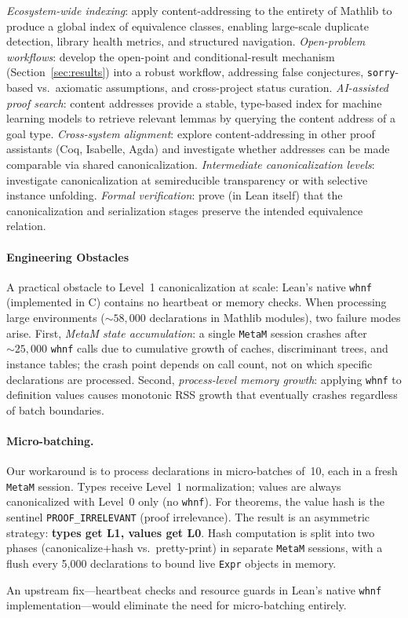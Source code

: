 \emph{Ecosystem-wide indexing}: apply
content-addressing to the entirety of Mathlib to produce a global index
of equivalence classes, enabling large-scale duplicate detection,
library health metrics, and structured navigation.
\emph{Open-problem workflows}: develop the open-point and
conditional-result mechanism (Section~\ref{sec:results}) into a robust
workflow, addressing false conjectures, \texttt{sorry}-based vs.\
axiomatic assumptions, and cross-project status curation.
\emph{AI-assisted proof search}: content addresses provide a stable,
type-based index for machine learning models to retrieve relevant lemmas
by querying the content address of a goal type.
\emph{Cross-system alignment}: explore content-addressing in other proof
assistants (Coq, Isabelle, Agda) and investigate whether addresses can
be made comparable via shared canonicalization.
\emph{Intermediate canonicalization levels}: investigate canonicalization
at semireducible transparency or with selective instance unfolding.
\emph{Formal verification}: prove (in Lean itself) that the
canonicalization and serialization stages preserve the intended
equivalence relation.



\paragraph{Engineering Obstacles}
\label{app:engineering}

A practical obstacle to Level~1 canonicalization at scale: Lean's native
\texttt{whnf} (implemented in C) contains no heartbeat or memory
checks.  When processing large environments (${\sim}58{,}000$
declarations in Mathlib modules), two failure modes arise.  First,
\emph{MetaM state accumulation}: a single \texttt{MetaM} session
crashes after ${\sim}25{,}000$ \texttt{whnf} calls due to cumulative
growth of caches, discriminant trees, and instance tables; the crash
point depends on call count, not on which specific declarations are
processed.  Second, \emph{process-level memory growth}: applying
\texttt{whnf} to definition values causes monotonic RSS growth that
eventually crashes regardless of batch boundaries.

\paragraph{Micro-batching.}  Our workaround is to process declarations
in micro-batches of~10, each in a fresh \texttt{MetaM} session.  Types
receive Level~1 normalization; values are always canonicalized with
Level~0 only (no \texttt{whnf}).  For theorems, the value hash is the
sentinel \texttt{PROOF\_IRRELEVANT} (proof irrelevance).  The result is
an asymmetric strategy: \textbf{types get L1, values get L0}.  Hash
computation is split into two phases (canonicalize+hash vs.\
pretty-print) in separate \texttt{MetaM} sessions, with a flush every
5{,}000 declarations to bound live \texttt{Expr} objects in memory.

An upstream fix---heartbeat checks and resource guards in Lean's native
\texttt{whnf} implementation---would eliminate the need for
micro-batching entirely.

